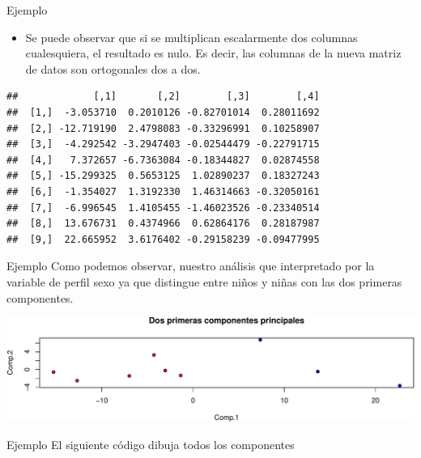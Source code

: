 \documentclass[
  ignorenonframetext,
]{beamer}
\newenvironment{Shaded}{\begin{snugshade}}{\end{snugshade}}
\newcommand{\AttributeTok}[1]{\textcolor[rgb]{0.77,0.63,0.00}{#1}}
\newcommand{\DecValTok}[1]{\textcolor[rgb]{0.00,0.00,0.81}{#1}}
\newcommand{\FunctionTok}[1]{\textcolor[rgb]{0.00,0.00,0.00}{#1}}
\newcommand{\NormalTok}[1]{#1}
\newcommand{\SpecialCharTok}[1]{\textcolor[rgb]{0.00,0.00,0.00}{#1}}
\newcommand{\StringTok}[1]{\textcolor[rgb]{0.31,0.60,0.02}{#1}}
\providecommand{\tightlist}{%
  \setlength{\itemsep}{0pt}\setlength{\parskip}{0pt}}
\begin{document}
\begin{frame}[fragile]{Ejemplo}
\protect\hypertarget{ejemplo-7}{}
\begin{itemize}
\tightlist
\item
  Se puede observar que si se multiplican escalarmente dos columnas
  cualesquiera, el resultado es nulo. Es decir, las columnas de la nueva
  matriz de datos son ortogonales dos a dos.
\end{itemize}

\begin{verbatim}
##             [,1]       [,2]        [,3]        [,4]
##  [1,]  -3.053710  0.2010126 -0.82701014  0.28011692
##  [2,] -12.719190  2.4798083 -0.33296991  0.10258907
##  [3,]  -4.292542 -3.2947403 -0.02544479 -0.22791715
##  [4,]   7.372657 -6.7363084 -0.18344827  0.02874558
##  [5,] -15.299325  0.5653125  1.02890237  0.18327243
##  [6,]  -1.354027  1.3192330  1.46314663 -0.32050161
##  [7,]  -6.996545  1.4105455 -1.46023526 -0.23340514
##  [8,]  13.676731  0.4374966  0.62864176  0.28187987
##  [9,]  22.665952  3.6176402 -0.29158239 -0.09477995
\end{verbatim}
\end{frame}

\begin{frame}{Ejemplo}
\protect\hypertarget{ejemplo-8}{}
Como podemos observar, nuestro análisis que interpretado por la variable
de perfil sexo ya que distingue entre niños y niñas con las dos primeras
componentes.

\includegraphics{AnalisisComponentesPrincipales_fusion_files/figure-beamer/plotACP1-1.pdf}
\end{frame}

\begin{frame}[fragile]{Ejemplo}
\protect\hypertarget{ejemplo-9}{}
El siguiente código dibuja todos los componentes

\begin{Shaded}
\end{Shaded}
\end{frame}
\end{document}
